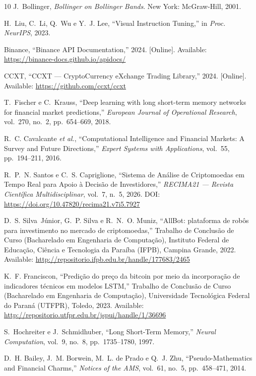 \documentclass[conference]{IEEEtran}
\begin{document}
\begin{thebibliography}{10}
J.~Bollinger,
\textit{Bollinger on Bollinger Bands}.
New York: McGraw-Hill, 2001.

H.~Liu, C.~Li, Q.~Wu e Y.~J. Lee,
``Visual Instruction Tuning,''
in \textit{Proc. NeurIPS}, 2023.

Binance,
``Binance API Documentation,''
2024. [Online]. Available: \url{https://binance-docs.github.io/apidocs/}

CCXT,
``CCXT — CryptoCurrency eXchange Trading Library,''
2024. [Online]. Available: \url{https://github.com/ccxt/ccxt}

T.~Fischer e C.~Krauss,
``Deep learning with long short-term memory networks for financial market predictions,''
\textit{European Journal of Operational Research}, vol.~270, no.~2, pp.~654--669, 2018.

R.~C. Cavalcante \textit{et al.},
``Computational Intelligence and Financial Markets: A Survey and Future Directions,''
\textit{Expert Systems with Applications}, vol.~55, pp.~194--211, 2016.

R.~P.~N. Santos e C.~S. Capriglione,
``Sistema de Análise de Criptomoedas em Tempo Real para Apoio à Decisão de Investidores,''
\textit{RECIMA21 --- Revista Científica Multidisciplinar}, vol.~7, n.~5, 2026.
DOI: \url{https://doi.org/10.47820/recima21.v7i5.7927}

D.~S. Silva~Júnior, G.~P. Silva e R.~N.~O. Muniz,
``AllBot: plataforma de robôs para investimento no mercado de criptomoedas,''
Trabalho de Conclusão de Curso (Bacharelado em Engenharia de Computação),
Instituto Federal de Educação, Ciência e Tecnologia da Paraíba (IFPB),
Campina Grande, 2022.
Available: \url{http://repositorio.ifpb.edu.br/handle/177683/2465}

K.~F. Franciscon,
``Predição do preço da bitcoin por meio da incorporação de indicadores técnicos em modelos LSTM,''
Trabalho de Conclusão de Curso (Bacharelado em Engenharia de Computação),
Universidade Tecnológica Federal do Paraná (UTFPR), Toledo, 2023.
Available: \url{http://repositorio.utfpr.edu.br/jspui/handle/1/36696}

S.~Hochreiter e J.~Schmidhuber,
``Long Short-Term Memory,''
\textit{Neural Computation}, vol.~9, no.~8, pp.~1735--1780, 1997.

D.~H. Bailey, J.~M. Borwein, M.~L. de Prado e Q.~J. Zhu,
``Pseudo-Mathematics and Financial Charms,''
\textit{Notices of the AMS}, vol.~61, no.~5, pp.~458--471, 2014.


\end{thebibliography}
\end{document}
